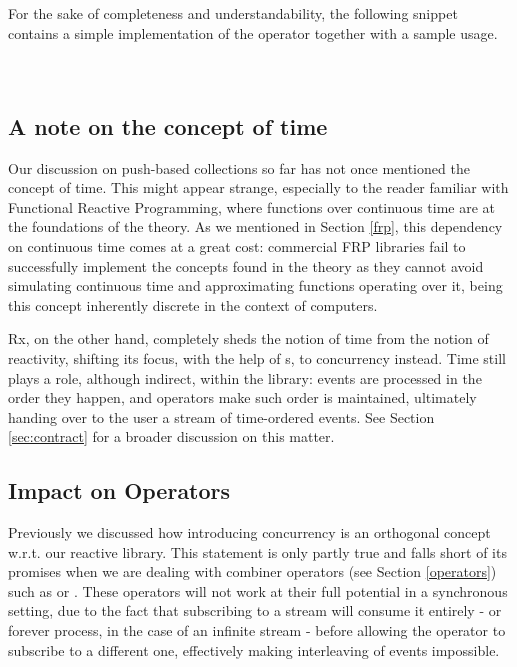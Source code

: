 For the sake of completeness and understandability, the following snippet contains a simple implementation of the  operator together with a sample usage.\\

\\

\\


\subsection{A note on the concept of time}

Our discussion on push-based collections so far has not once mentioned the concept of time. This might appear strange, especially to the reader familiar with Functional Reactive Programming, where functions over continuous time are at the foundations of the theory. As we mentioned in Section \ref{frp}, this dependency on continuous time comes at a great cost: commercial FRP libraries fail to successfully implement the concepts found in the theory as they cannot avoid simulating continuous time and approximating functions operating over it, being this concept inherently discrete in the context of computers.

Rx, on the other hand, completely sheds the notion of time from the notion of reactivity\cite{meijer2010observable}, shifting its focus, with the help of s, to concurrency instead. Time still plays a role, although indirect, within the library: events are processed in the order they happen, and operators make such order is maintained, ultimately handing over to the user a stream of time-ordered events. See Section \ref{sec:contract} for a broader discussion on this matter.

\subsection{Impact on Operators}

Previously we discussed how introducing concurrency is an orthogonal concept w.r.t. our reactive library. This statement is only partly true and falls short of its promises when we are dealing with combiner operators (see Section \ref{operators}) such as \code{(>>=)} or . These operators will not work at their full potential in a synchronous setting, due to the fact that subscribing to a stream will consume it entirely - or forever process, in the case of an infinite stream - before allowing the operator to subscribe to a different one, effectively making interleaving of events impossible.

